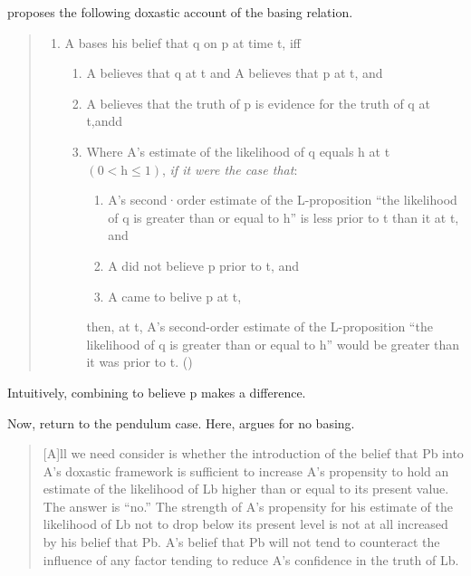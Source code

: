 \begin{note}
  \citeauthor{Tolliver:1982us} proposes the following doxastic account of the basing relation.
  \begin{quote}
    \begin{enumerate}[label=(B\('\))]
    \item
      A bases his belief that q on p at time t, iff
      \begin{enumerate}[label=(\arabic*)]
      \item
        A believes that q at t and A believes that p at t, and
      \item
        A believes that the truth of p is evidence for the truth of q at t,andd
      \item
        Where A's estimate of the likelihood of q equals h at t \((0 < \text{h} \leq 1)\), \emph{if it were the case that}:
        \begin{enumerate}[label=(\roman*)]
        \item
          A's second·order estimate of the L-proposition ``the likelihood of q is greater than or equal to h'' is less prior to t than it at t, and
        \item
          A did not believe p prior to t, and
        \item
          A came to belive p at t,
        \end{enumerate}
        then, at t, A's second-order estimate of the L-proposition ``the likelihood of q is greater than or equal to h'' would be greater than it was prior to t.%
        \mbox{}\hfill\mbox{(\citeyear[159]{Tolliver:1982us})}
      \end{enumerate}
    \end{enumerate}
  \end{quote}

  Intuitively, combining to believe p makes a difference.

  Now, return to the pendulum case.
  Here, \citeauthor{Tolliver:1982us} argues for no basing.

  \begin{quote}
    [A]ll we need consider is whether the introduction of the belief that Pb into A's doxastic framework is sufficient to increase A's propensity to hold an estimate of the likelihood of Lb higher than or equal to its present value.
    The answer is ``no.''
    The strength of A's propensity for his estimate of the likelihood of Lb not to drop below its present level is not at all increased by his belief that Pb.
    A's belief that Pb will not tend to counteract the influence of any factor tending to reduce A's confidence in the truth of Lb.
  \end{quote}


\end{note}
